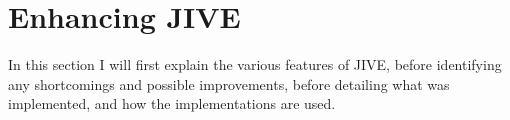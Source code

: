 \section{Enhancing JIVE}\label{enhJive}

In this section I will first explain the various features of JIVE, before identifying any shortcomings and possible improvements, before detailing what was implemented, and how the implementations are used.






